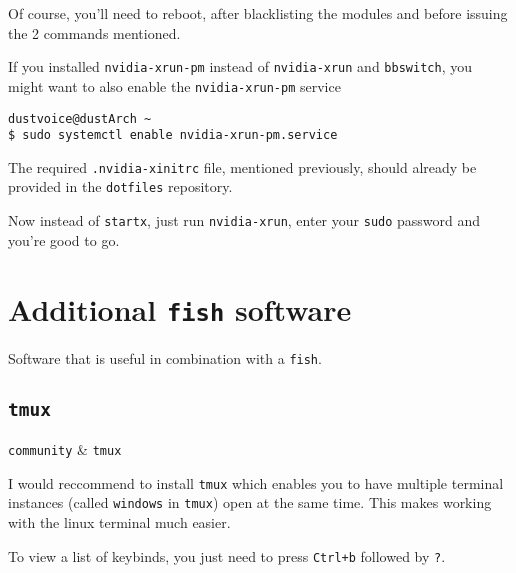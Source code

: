 \documentclass[10pt]{dustdoc}
\begin{document}
\begin{NOTE}
    Of course, you’ll need to reboot, after blacklisting the modules and before issuing the 2 commands mentioned.
\end{NOTE}

\begin{NOTE}
    If you installed \texttt{nvidia-xrun-pm} instead of \texttt{nvidia-xrun} and \texttt{bbswitch}, you might want to also enable the \texttt{nvidia-xrun-pm} service

    \begin{verbatim}
dustvoice@dustArch ~
$ sudo systemctl enable nvidia-xrun-pm.service
    \end{verbatim}

\end{NOTE}

\begin{NOTE}
    The required \texttt{.nvidia-xinitrc} file, mentioned previously, should already be provided in the \texttt{dotfiles} repository.
\end{NOTE}

Now instead of \texttt{startx}, just run \texttt{nvidia-xrun}, enter your \texttt{sudo} password and you’re good to go.

\section{Additional \texttt{fish} software}%
\label{sec:additional-fish-software}

Software that is useful in combination with a \texttt{fish}.

\subsection{\texttt{tmux}}%
\label{sec:tmux}

\begin{pkgtable}
    \texttt{community} & \texttt{tmux} \\
\end{pkgtable}

I would reccommend to install \texttt{tmux} which enables you to have multiple terminal instances (called \texttt{windows} in \texttt{tmux}) open at the same time.
This makes working with the linux terminal much easier.

\begin{NOTE}
    To view a list of keybinds, you just need to press \texttt{Ctrl+b} followed by \texttt{?}.
\end{NOTE}
\end{document}
